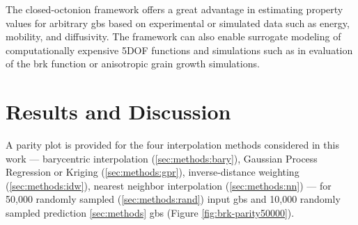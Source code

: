 \documentclass[preprint,12pt]{elsarticle}
\begin{document}
The closed-octonion framework offers a great advantage in estimating property values for arbitrary \glspl{gb} based on experimental or simulated data such as energy, mobility, and diffusivity. The framework can also enable surrogate modeling of computationally expensive 5DOF functions and simulations such as in evaluation of the \gls{brk} function or anisotropic grain growth simulations.

\section{Results and Discussion} \label{sec:resultsDiscussion}

A parity plot is provided for the four interpolation methods considered in this work --- barycentric interpolation (\ref{sec:methods:bary}), Gaussian Process Regression or Kriging (\ref{sec:methods:gpr}), inverse-distance weighting (\ref{sec:methods:idw}), nearest neighbor interpolation (\ref{sec:methods:nn}) --- for 50,000 randomly sampled (\ref{sec:methods:rand}) input \glspl{gb} and 10,000 randomly sampled prediction \ref{sec:methods} \glspl{gb} (Figure \ref{fig:brk-parity50000}).
\end{document}
